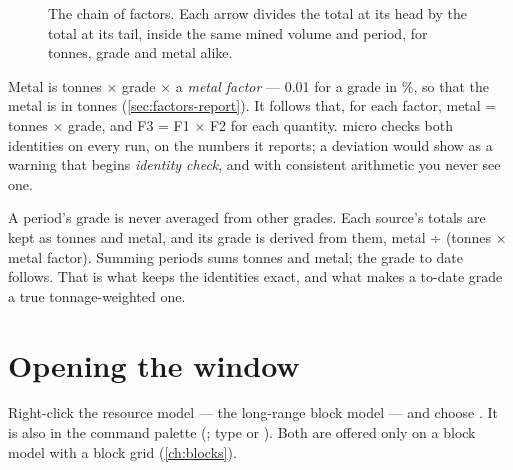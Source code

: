 \begin{figure}[htbp]\centering
{}
\caption{The chain of factors. Each arrow divides the total at its head by the total at its tail, inside the same mined volume and period, for tonnes, grade and metal alike.}\label{fig:factors-chain}
\end{figure}

Metal is tonnes × grade × a \emph{metal factor} — 0.01 for a grade in \%, so that the metal is in tonnes (\cref{sec:factors-report}). It follows that, for each factor, metal = tonnes × grade, and F3 = F1 × F2 for each quantity. micro checks both identities on every run, on the numbers it reports; a deviation would show as a warning that begins \emph{identity check}, and with consistent arithmetic you never see one.

\begin{why}
A period's grade is never averaged from other grades. Each source's totals are kept as tonnes and metal, and its grade is derived from them, metal ÷ (tonnes × metal factor). Summing periods sums tonnes and metal; the grade to date follows. That is what keeps the identities exact, and what makes a to-date grade a true tonnage-weighted one.
\end{why}

\section{Opening the window}\label{sec:factors-open}
Right-click the resource model — the long-range block model — and choose . It is also in the command palette (; type  or ). Both are offered only on a block model with a block grid (\cref{ch:blocks}).

